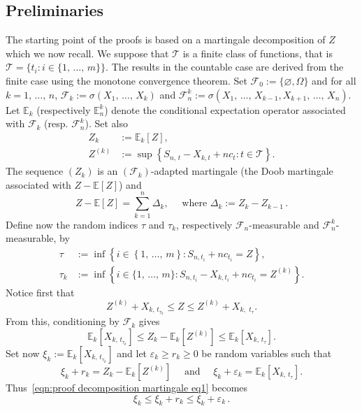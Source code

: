 \documentclass[AHL,Unicode,longabstracts,published]{cedram}
\newcommand{\bE}{\mathbb{E}}
\newcommand{\cF}{\mathcal{F}}
\newcommand{\cT}{\mathcal{T}}
\begin{document}
\subsection{Preliminaries}
The starting point of the proofs is based on a martingale decomposition of $Z$ which we now recall. We suppose that $\cT$ is a finite class of functions, that is $\cT=\{t_i : i\in\{1,\,\ldots,\,m\}\}$. The results in the countable case are derived from the finite case using the monotone convergence theorem. Set $\cF_0:=\{\varnothing,\Omega\}$ and for all $k=1,\,\ldots,\,n$, $\cF_k:=\sigma(X_1,\,\ldots, \,X_k)$ and $\cF_n^k:=\sigma(X_1,\,\ldots,\,X_{k-1},X_{k+1},\,\ldots,\,X_n)$. Let $\bE_k$ (respectively $\bE_n^k$) denote the conditional expectation operator associated with $\cF_k$ (resp. $\cF^k_n$). Set also
\begin{align}
Z_k&:=\bE_k[Z],\\
Z^{(k)}&:=\sup\left\{S_{n,\,t}-X_{k,t}+nc_t : t\in\cT\right\}. \label{eqn:def Z^k}
\end{align}
The sequence $(Z_k)$ is an $(\cF_k)$-adapted martingale (the Doob martingale associated with $Z-\bE[Z]$) and
\begin{equation}\label{eqn:decomposition Doob Z}
Z-\bE[Z]=\sum_{k=1}^n \Delta_k,\quad \text{ where }\Delta_k:=Z_k-Z_{k-1}\,.
\end{equation}
Define now the random indices $\tau$ and $\tau_k$, respectively $\cF_n$-measurable and $\cF_n^k$-measurable, by
\begin{align}
\tau &:=\inf\left\{i\in\left\{1,\,\ldots,\,m\right\} : S_{n,t_i}+nc_{t_i}=Z\right\},\\
\tau_k &:=\inf\left\{i\in\{1,\,\ldots,\,m\} : S_{n,t_i}-X_{k,t_i}+nc_{t_i}=Z^{(k)}\right\}.
\end{align}
Notice first that
\[
Z^{(k)}+X_{k,\,t_{\tau_k}}\leq Z\leq Z^{(k)}+X_{k,\,\,t_\tau}.
\]
From this, conditioning by $\cF_k$ gives
\begin{equation}\label{eqn:proof decomposition martingale eq1}
\bE_k\left[X_{k,\,t_{\tau_k}}\right]\leq Z_k-\bE_k\left[Z^{(k)}\right]\leq\bE_k\left[X_{k,\,t_\tau}\right].
\end{equation}
Set now $\xi_k:=\bE_k[X_{k,\,t_{\tau_k}}]$ and let $\varepsilon_k\geq r_k\geq 0$ be random variables such that
\[
\xi_k+r_k=Z_k-\bE_k\left[Z^{(k)}\right]\quad\text{ and }\quad \xi_k+\varepsilon_k=\bE_k\left[X_{k,\,t_\tau}\right].
\]
Thus~\eqref{eqn:proof decomposition martingale eq1} becomes
\begin{equation}\label{eqn:proof decomposition martingale eq2}
\xi_k\leq\xi_k+ r_k\leq \xi_k+\varepsilon_k\,.
\end{equation}
\end{document}
